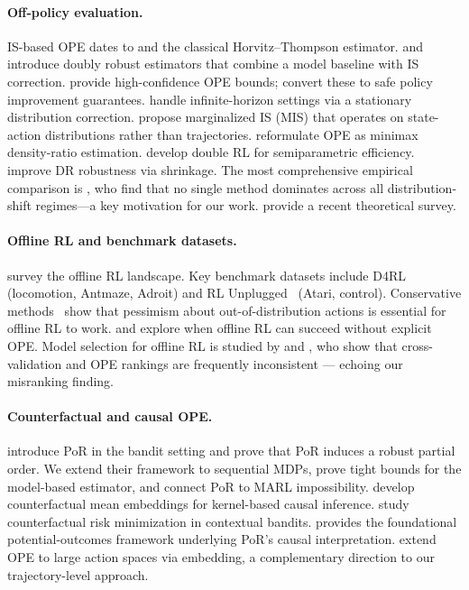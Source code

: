 \documentclass[10pt]{article}
\theoremstyle{plain}
\theoremstyle{definition}
\theoremstyle{remark}
\begin{document}
\paragraph{Off-policy evaluation.}
IS-based OPE dates to \citet{precup2000eligibility} and the classical
Horvitz--Thompson estimator.  \citet{jiang2016doubly} and \citet{dudik2011doubly}
introduce doubly robust estimators that combine a model baseline with IS
correction.  \citet{thomas2016data} provide high-confidence OPE bounds;
\citet{thomas2015high} convert these to safe policy improvement guarantees.
\citet{liu2018breaking} handle infinite-horizon settings via a stationary
distribution correction.  \citet{xie2019towards} propose marginalized IS
(MIS) that operates on state-action distributions rather than trajectories.
\citet{nachum2019dualdice} reformulate OPE as minimax density-ratio
estimation.  \citet{kallus2020double} develop double RL for semiparametric
efficiency.  \citet{farajtabar2018more} improve DR robustness via shrinkage.
The most comprehensive empirical comparison is \citet{voloshin2021empirical},
who find that no single method dominates across all distribution-shift
regimes---a key motivation for our work.
\citet{uehara2022review} provide a recent theoretical survey.

\paragraph{Offline RL and benchmark datasets.}
\citet{levine2020offline} survey the offline RL landscape.  Key benchmark
datasets include D4RL~\citep{fu2020d4rl} (locomotion, Antmaze, Adroit) and
RL Unplugged~\citep{gulcehre2020rl} (Atari, control).  Conservative
methods~\citep{kumar2020conservative} show that pessimism about
out-of-distribution actions is essential for offline RL to work.
\citet{agarwal2020optimistic} and \citet{brandfonbrener2021offline} explore
when offline RL can succeed without explicit OPE.
Model selection for offline RL is studied by \citet{paine2020hyperparameter}
and \citet{tang2021model}, who show that cross-validation and OPE rankings
are frequently inconsistent --- echoing our misranking finding.

\paragraph{Counterfactual and causal OPE.}
\citet{kawakami2025potential} introduce PoR in the bandit setting and prove
that PoR induces a robust partial order.  We extend their framework to
sequential MDPs, prove tight bounds for the model-based estimator, and connect
PoR to MARL impossibility.  \citet{muandet2021counterfactual} develop
counterfactual mean embeddings for kernel-based causal inference.
\citet{swaminathan2015counterfactual} study counterfactual risk minimization
in contextual bandits.  \citet{pearl2009causality} provides the foundational
potential-outcomes framework underlying PoR's causal interpretation.
\citet{saito2022offpolicy} extend OPE to large action spaces via embedding,
a complementary direction to our trajectory-level approach.
\end{document}
